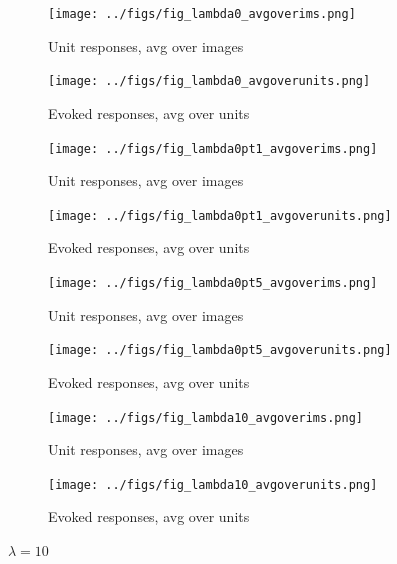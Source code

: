 \documentclass[12pt]{article}
\begin{document}
\begin{figure}[h!]
    \centering
    \begin{subfigure}[b]{0.45\textwidth}
        \texttt{[image: ../figs/fig\_lambda0\_avgoverims.png]}
        \caption{Unit responses, avg over images}
    \end{subfigure}    
    \begin{subfigure}[b]{0.45\textwidth}
       
\texttt{[image: ../figs/fig\_lambda0\_avgoverunits.png]}
        \caption{Evoked responses, avg over units}
    \end{subfigure}    
    \caption{$\lambda=0$}

    \begin{subfigure}[b]{0.45\textwidth}
        \texttt{[image: ../figs/fig\_lambda0pt1\_avgoverims.png]}
        \caption{Unit responses, avg over images}
    \end{subfigure}    
    \begin{subfigure}[b]{0.45\textwidth}
       
\texttt{[image: ../figs/fig\_lambda0pt1\_avgoverunits.png]}
        \caption{Evoked responses, avg over units}
    \end{subfigure}    
    \caption{$\lambda=0.1$}

    \begin{subfigure}[b]{0.45\textwidth}
        \texttt{[image: ../figs/fig\_lambda0pt5\_avgoverims.png]}
        \caption{Unit responses, avg over images}
    \end{subfigure}    
    \begin{subfigure}[b]{0.45\textwidth}
       
\texttt{[image: ../figs/fig\_lambda0pt5\_avgoverunits.png]}
        \caption{Evoked responses, avg over units}
    \end{subfigure}    
    \caption{$\lambda=0.5$}

    \begin{subfigure}[b]{0.45\textwidth}
        \texttt{[image: ../figs/fig\_lambda10\_avgoverims.png]}
        \caption{Unit responses, avg over images}
    \end{subfigure}    
    \begin{subfigure}[b]{0.45\textwidth}
       
\texttt{[image: ../figs/fig\_lambda10\_avgoverunits.png]}
        \caption{Evoked responses, avg over units}
    \end{subfigure}    
    \caption{$\lambda=10$}

\end{figure}
\end{document}
